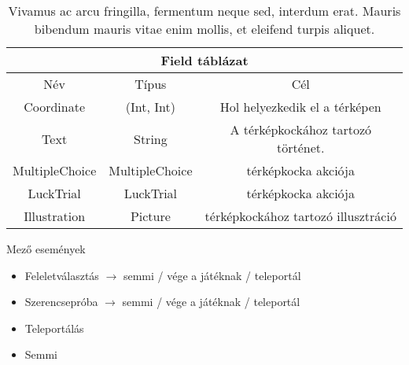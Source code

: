 \begin{table}[htb]
	\centering
	\begin{tabular}{ |c|c|c| }
		\hline
		\multicolumn{3}{|c|}{Field táblázat}\\
		\hline
		Név & Típus & Cél \\
		\hline
		Coordinate  & (Int, Int)  & Hol helyezkedik el a térképen  \\
		\hline
		Text & String & A térképkockához tartozó történet.\\
		\hline
		MultipleChoice & MultipleChoice & térképkocka akciója\\
		\hline
		LuckTrial & LuckTrial & térképkocka akciója\\
		\hline
		Illustration & Picture& térképkockához tartozó illusztráció\\
		\hline
	\end{tabular}
	\caption[Rövid cím a táblázatjegyzékbe]{Vivamus ac arcu fringilla, fermentum neque sed, interdum erat. Mauris bibendum mauris vitae enim mollis, et eleifend turpis aliquet.}
	\label{tab:example-2}
\end{table}

Mező események
\begin{itemize}
	\item Feleletválasztás $\rightarrow$ semmi / vége a játéknak / teleportál
	\item Szerencsepróba $\rightarrow$ semmi / vége a játéknak / teleportál
	\item Teleportálás
	\item Semmi
\end{itemize}